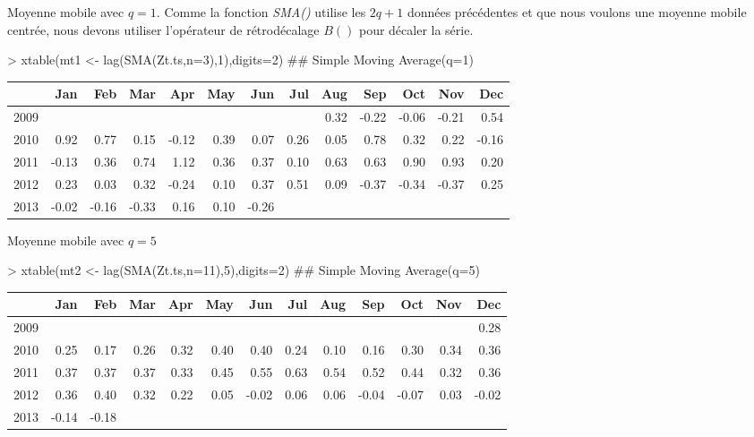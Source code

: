 \documentclass{article}
\begin{document}
Moyenne mobile avec $q=1$. Comme la fonction \emph{SMA()} utilise les $2q+1$ 
données précédentes et que nous voulons une moyenne mobile centrée, nous devons utiliser l'opérateur de rétrodécalage $B()$ pour décaler la série.

\begin{Schunk}
\begin{Sinput}
> xtable(mt1 <- lag(SMA(Zt.ts,n=3),1),digits=2) ## Simple Moving Average(q=1)
\end{Sinput}
\begin{table}[ht]
\centering
\begin{tabular}{rrrrrrrrrrrrr}
  \hline
 & Jan & Feb & Mar & Apr & May & Jun & Jul & Aug & Sep & Oct & Nov & Dec \\ 
  \hline
2009 &  &  &  &  &  &  &  & 0.32 & -0.22 & -0.06 & -0.21 & 0.54 \\ 
  2010 & 0.92 & 0.77 & 0.15 & -0.12 & 0.39 & 0.07 & 0.26 & 0.05 & 0.78 & 0.32 & 0.22 & -0.16 \\ 
  2011 & -0.13 & 0.36 & 0.74 & 1.12 & 0.36 & 0.37 & 0.10 & 0.63 & 0.63 & 0.90 & 0.93 & 0.20 \\ 
  2012 & 0.23 & 0.03 & 0.32 & -0.24 & 0.10 & 0.37 & 0.51 & 0.09 & -0.37 & -0.34 & -0.37 & 0.25 \\ 
  2013 & -0.02 & -0.16 & -0.33 & 0.16 & 0.10 & -0.26 &  &  &  &  &  &  \\ 
   \hline
\end{tabular}
\end{table}\end{Schunk}
\clearpage 
Moyenne mobile avec $q=5$
\begin{Schunk}
\begin{Sinput}
> xtable(mt2 <- lag(SMA(Zt.ts,n=11),5),digits=2) ## Simple Moving Average(q=5)
\end{Sinput}
\begin{table}[ht]
\centering
\begin{tabular}{rrrrrrrrrrrrr}
  \hline
 & Jan & Feb & Mar & Apr & May & Jun & Jul & Aug & Sep & Oct & Nov & Dec \\ 
  \hline
2009 &  &  &  &  &  &  &  &  &  &  &  & 0.28 \\ 
  2010 & 0.25 & 0.17 & 0.26 & 0.32 & 0.40 & 0.40 & 0.24 & 0.10 & 0.16 & 0.30 & 0.34 & 0.36 \\ 
  2011 & 0.37 & 0.37 & 0.37 & 0.33 & 0.45 & 0.55 & 0.63 & 0.54 & 0.52 & 0.44 & 0.32 & 0.36 \\ 
  2012 & 0.36 & 0.40 & 0.32 & 0.22 & 0.05 & -0.02 & 0.06 & 0.06 & -0.04 & -0.07 & 0.03 & -0.02 \\ 
  2013 & -0.14 & -0.18 &  &  &  &  &  &  &  &  &  &  \\ 
   \hline
\end{tabular}
\end{table}\end{Schunk}
\end{document}

